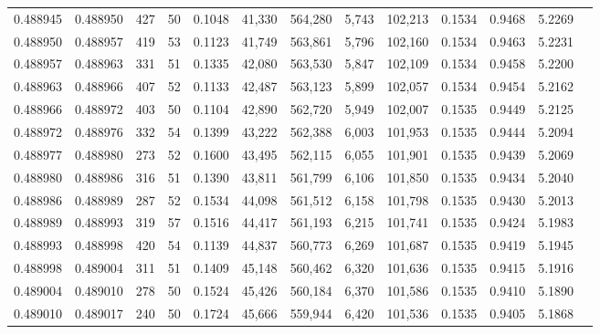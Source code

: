 \begin{tabular}{rrrrrrrrrrrrr}
0.488945 & 0.488950 & 427 &  50 &                                     0.1048 &  41,330 & 564,280 &   5,743 & 102,213 & 0.1534 & 0.9468 & 5.2269 \\
0.488950 & 0.488957 & 419 &  53 &                                     0.1123 &  41,749 & 563,861 &   5,796 & 102,160 & 0.1534 & 0.9463 & 5.2231 \\
0.488957 & 0.488963 & 331 &  51 &                                     0.1335 &  42,080 & 563,530 &   5,847 & 102,109 & 0.1534 & 0.9458 & 5.2200 \\
0.488963 & 0.488966 & 407 &  52 &                                     0.1133 &  42,487 & 563,123 &   5,899 & 102,057 & 0.1534 & 0.9454 & 5.2162 \\
0.488966 & 0.488972 & 403 &  50 &                                     0.1104 &  42,890 & 562,720 &   5,949 & 102,007 & 0.1535 & 0.9449 & 5.2125 \\
0.488972 & 0.488976 & 332 &  54 &                                     0.1399 &  43,222 & 562,388 &   6,003 & 101,953 & 0.1535 & 0.9444 & 5.2094 \\
0.488977 & 0.488980 & 273 &  52 &                                     0.1600 &  43,495 & 562,115 &   6,055 & 101,901 & 0.1535 & 0.9439 & 5.2069 \\
0.488980 & 0.488986 & 316 &  51 &                                     0.1390 &  43,811 & 561,799 &   6,106 & 101,850 & 0.1535 & 0.9434 & 5.2040 \\
0.488986 & 0.488989 & 287 &  52 &                                     0.1534 &  44,098 & 561,512 &   6,158 & 101,798 & 0.1535 & 0.9430 & 5.2013 \\
0.488989 & 0.488993 & 319 &  57 &                                     0.1516 &  44,417 & 561,193 &   6,215 & 101,741 & 0.1535 & 0.9424 & 5.1983 \\
0.488993 & 0.488998 & 420 &  54 &                                     0.1139 &  44,837 & 560,773 &   6,269 & 101,687 & 0.1535 & 0.9419 & 5.1945 \\
0.488998 & 0.489004 & 311 &  51 &                                     0.1409 &  45,148 & 560,462 &   6,320 & 101,636 & 0.1535 & 0.9415 & 5.1916 \\
0.489004 & 0.489010 & 278 &  50 &                                     0.1524 &  45,426 & 560,184 &   6,370 & 101,586 & 0.1535 & 0.9410 & 5.1890 \\
0.489010 & 0.489017 & 240 &  50 &                                     0.1724 &  45,666 & 559,944 &   6,420 & 101,536 & 0.1535 & 0.9405 & 5.1868 \\

\end{tabular}
